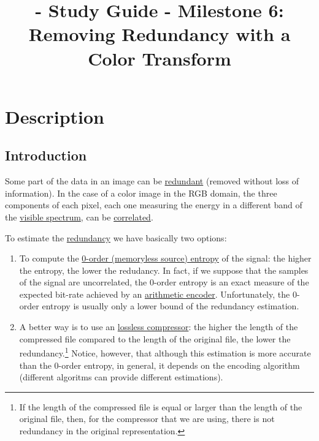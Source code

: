 
\title{\SM{} - Study Guide - Milestone 6: Removing Redundancy with a Color Transform}

\maketitle

\tableofcontents

\section{Description}

\subsection{Introduction}
Some part of the data in an image can be
\href{https://en.wikipedia.org/wiki/Data_redundancy}{redundant}
(removed without loss of information). In the case of a color image in
the RGB domain, the three components of each pixel, each one measuring
the energy in a different band of the
\href{https://en.wikipedia.org/wiki/Visible_spectrum}{visible
  spectrum}, can be
\href{https://en.wikipedia.org/wiki/Correlation_and_dependence}{correlated}.

To estimate the
\href{https://en.wikipedia.org/wiki/Redundancy_(information_theory)}{redundancy}
we have basically two options:
\begin{enumerate}
\item To compute the
  \href{https://en.wikipedia.org/wiki/Entropy_(information_theory)}{0-order
    (memoryless source) entropy} of the signal: the higher the
  entropy, the lower the redudancy. In fact, if we suppose that the
  samples of the signal are uncorrelated, the 0-order entropy is an
  exact measure of the expected bit-rate achieved by an
  \href{https://en.wikipedia.org/wiki/Arithmetic_coding}{arithmetic
    encoder}. Unfortunately, the 0-order entropy is usually only a
  lower bound of the redundancy estimation.
\item A better way is to use an
  \href{https://en.wikipedia.org/wiki/Data_compression}{lossless
    compressor}: the higher the length of the compressed file compared
  to the length of the original file, the lower the
  redundancy.\footnote{If the length of the compressed file is equal or
  larger than the length of the original file, then, for the compressor
  that we are using, there is not redundancy in the original
  representation.} Notice, however, that although this estimation is
  more accurate than the 0-order entropy, in general, it depends on the
  encoding algorithm (different algoritms can provide different
  estimations).
\end{enumerate}

